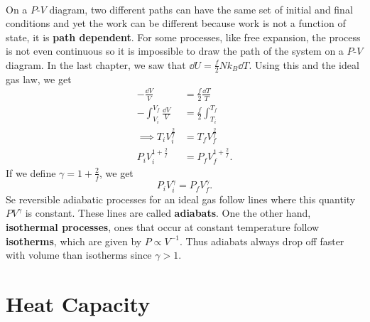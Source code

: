 \documentclass[../thermodynamics.tex]{subfiles}
\begin{document}
        \paragraph{}
        On a $P$-$V$ diagram, two different paths can have the same set of initial and final conditions and yet the work can be different because work is not a function of state, it is \textbf{path dependent}.
        For some processes, like free expansion, the process is not even continuous so it is impossible to draw the path of the system on a $P$-$V$ diagram.
        In the last chapter, we saw that $\dd{U}=\frac{f}{2}Nk_B\dd{T}$.
        Using this and the ideal gas law, we get
        \begin{align}
            -\frac{\dd{V}}{V}&=\frac{f}{2}\frac{\dd{T}}{T}\\
            -\int_{V_i}^{V_f}\frac{\dd{V}}{V}&=\frac{f}{2}\int_{T_i}^{T_f}\\
            \implies T_iV_i^{\frac{2}{f}}&=T_fV_f^{\frac{2}{f}}\\
            P_iV_i^{1+\frac{2}{f}}&=P_fV_f^{1+\frac{2}{f}}.
        \end{align}
        If we define $\gamma=1+\frac{2}{f}$, we get
        \begin{equation}
            P_iV_i^\gamma=P_fV_f^\gamma.
        \end{equation}
        Se reversible adiabatic processes for an ideal gas follow lines where this quantity $PV^\gamma$ is constant.
        These lines are called \textbf{adiabats}.
        One the other hand, \textbf{isothermal processes}, ones that occur at constant temperature follow \textbf{isotherms}, which are given by $P\propto V^{-1}$.
        Thus adiabats always drop off faster with volume than isotherms since $\gamma>1$.

    \section{Heat Capacity}
\end{document}
